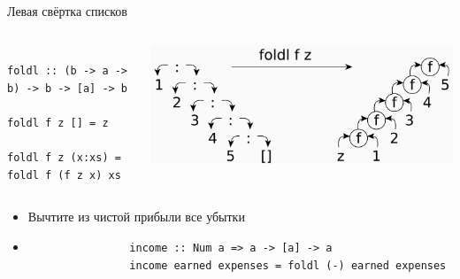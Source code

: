     \begin{frame}[fragile]{Левая свёртка списков}
        \vspace{-1em}
        \begin{columns}[onlytextwidth]
            \begin{column}{0.485\textwidth}
                \begin{verbatim}
                    foldl :: (b -> a -> b) -> b -> [a] -> b
                    foldl f z [] = z
                    foldl f z (x:xs) = foldl f (f z x) xs
                \end{verbatim}
            \end{column}\hfill%
            \begin{column}{0.5\textwidth}
                \begin{center}
                    \includegraphics[width=1\textwidth]{figs/foldl}
                \end{center}
            \end{column}
        \end{columns}
        \vspace{0.5em}
        \begin{itemize}
            \item[\todo] Вычтите из чистой прибыли все убытки
            \item[\answer] \pause
            \begin{verbatim}
                income :: Num a => a -> [a] -> a
                income earned expenses = foldl (-) earned expenses
            \end{verbatim}
        \end{itemize}
    \end{frame}

